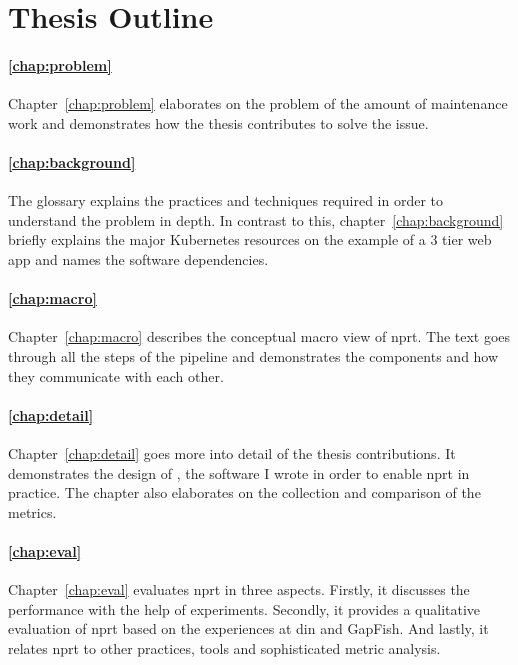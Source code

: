 \section{Thesis Outline}

\paragraph{\ref{chap:problem} }
Chapter~\ref{chap:problem} elaborates on the problem of the amount of maintenance work and
demonstrates how the thesis contributes to solve the issue.

\paragraph{\ref{chap:background} }
The glossary explains the practices and techniques required in order to understand the
problem in depth. In contrast to this, chapter~\ref{chap:background} briefly explains the
major Kubernetes resources on the example of a 3 tier web app and names the software
dependencies.

\paragraph{\ref{chap:macro} }
Chapter~\ref{chap:macro} describes the conceptual macro view of \gls{nprt}. The text goes
through all the steps of the pipeline and demonstrates the components and how they
communicate with each other.

\paragraph{\ref{chap:detail} }
Chapter~\ref{chap:detail} goes more into detail of the thesis contributions. It
demonstrates the design of \deployer, the software I wrote in order to enable \gls{nprt}
in practice. The chapter also elaborates on the collection and comparison of the metrics.

\paragraph{\ref{chap:eval} }
Chapter~\ref{chap:eval} evaluates \gls{nprt} in three aspects. Firstly, it discusses the
performance with the help of experiments. Secondly, it provides a qualitative evaluation
of \gls{nprt} based on the experiences at \gls{din} and GapFish. And lastly, it relates
\gls{nprt} to other practices, tools and sophisticated metric analysis.

